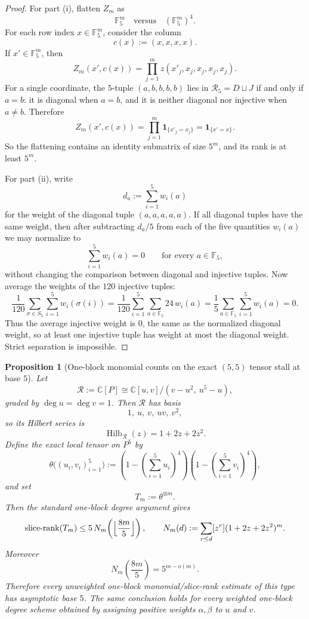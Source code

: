 \documentclass[11pt]{article}
\newtheorem{proposition}[theorem]{Proposition}
\theoremstyle{definition}
\newcommand{\1}{\mathbf{1}}
\begin{document}
\begin{proof}
For part (i), flatten $Z_m$ as
\[
\mathbb F_5^m \quad\text{versus}\quad (\mathbb F_5^m)^4.
\]
For each row index $x\in \mathbb F_5^m$, consider the column
\[
c(x):=(x,x,x,x).
\]
If $x'\in \mathbb F_5^m$, then
\[
Z_m(x',c(x))=\prod_{j=1}^m z(x'_j,x_j,x_j,x_j,x_j).
\]
For a single coordinate, the $5$-tuple $(a,b,b,b,b)$ lies in $\mathcal R_5=D\sqcup J$ if and only if $a=b$: it is diagonal when $a=b$, and it is neither diagonal nor injective when $a\neq b$. Therefore
\[
Z_m(x',c(x))=\prod_{j=1}^m \mathbf 1_{\{x'_j=x_j\}}=\mathbf 1_{\{x'=x\}}.
\]
So the flattening contains an identity submatrix of size $5^m$, and its rank is at least $5^m$.

For part (ii), write
\[
d_a:=\sum_{i=1}^5 w_i(a)
\]
for the weight of the diagonal tuple $(a,a,a,a,a)$. If all diagonal tuples have the same weight, then after subtracting $d_a/5$ from each of the five quantities $w_i(a)$ we may normalize to
\[
\sum_{i=1}^5 w_i(a)=0
\qquad\text{for every }a\in \mathbb F_5,
\]
without changing the comparison between diagonal and injective tuples. Now average the weights of the $120$ injective tuples:
\[
\frac{1}{120}\sum_{\sigma\in S_5}\sum_{i=1}^5 w_i(\sigma(i))
=
\frac{1}{120}\sum_{i=1}^5 \sum_{a\in\mathbb F_5} 24\,w_i(a)
=
\frac{1}{5}\sum_{a\in\mathbb F_5}\sum_{i=1}^5 w_i(a)
=
0.
\]
Thus the average injective weight is $0$, the same as the normalized diagonal weight, so at least one injective tuple has weight at most the diagonal weight. Strict separation is impossible.
\end{proof}

\begin{proposition}[One-block monomial counts on the exact $(5,5)$ tensor stall at base $5$]\label{prop:555-local-monomial-obstruction}
Let
\[
\mathscr R:=\mathbb C[P]\cong \mathbb C[u,v]/(v-u^2,\ u^5-u),
\]
graded by $\deg u=\deg v=1$. Then $\mathscr R$ has basis
\[
1,\ u,\ v,\ uv,\ v^2,
\]
so its Hilbert series is
\[
\operatorname{Hilb}_{\mathscr R}(z)=1+2z+2z^2.
\]
Define the exact local tensor on $P^5$ by
\[
\theta\bigl((u_i,v_i)_{i=1}^5\bigr):=
\left(1-\left(\sum_{i=1}^5 u_i\right)^4\right)
\left(1-\left(\sum_{i=1}^5 v_i\right)^4\right),
\]
and set
\[
T_m:=\theta^{\otimes m}.
\]
Then the standard one-block degree argument gives
\[
\operatorname{slice\text{-}rank}(T_m)\le 5\,N_m\!\left(\Bigl\lfloor\frac{8m}{5}\Bigr\rfloor\right),
\qquad
N_m(d):=\sum_{r\le d}[z^r](1+2z+2z^2)^m.
\]
Moreover
\[
N_m\!\left(\frac{8m}{5}\right)=5^{m-o(m)}.
\]
Therefore every unweighted one-block monomial/slice-rank estimate of this type has asymptotic base $5$. The same conclusion holds for every weighted one-block degree scheme obtained by assigning positive weights $\alpha,\beta$ to $u$ and $v$.
\end{proposition}
\end{document}
